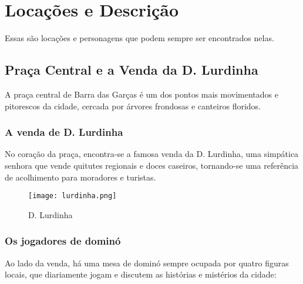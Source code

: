 \chapter{Locações e Descrição}

Essas são locações e personagens que podem sempre ser encontrados nelas.

\section{Praça Central e a Venda da D. Lurdinha}

A praça central de Barra das Garças é um dos pontos mais movimentados e pitorescos da cidade, cercada por árvores frondosas e canteiros floridos. 

\subsection{A venda de D. Lurdinha}

No coração da praça, encontra-se a famosa venda da D. Lurdinha, uma simpática senhora que vende quitutes regionais e doces caseiros, tornando-se uma referência de acolhimento para moradores e turistas. 


\begin{figure}[hbt]
    \centering
    \texttt{[image: lurdinha.png]}
    \caption{D. Lurdinha}
    \label{figfantasma}
\end{figure}

\subsection{Os jogadores de dominó}


Ao lado da venda, há uma mesa de dominó sempre ocupada por quatro figuras locais, que diariamente jogam e discutem as histórias e mistérios da cidade:


